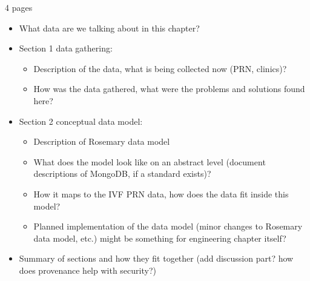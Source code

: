 4 pages

\begin{itemize}
	\item What data are we talking about in this chapter?
	\item Section 1 data gathering:
	\begin{itemize}
		\item Description of the data, what is being collected now (PRN, clinics)?
		\item How was the data gathered, what were the problems and solutions found here?
	\end{itemize}
	\item Section 2 conceptual data model:
	\begin{itemize}
		\item Description of Rosemary data model
		\item What does the model look like on an abstract level (document descriptions of MongoDB, if a standard exists)?
		\item How it maps to the IVF PRN data, how does the data fit inside this model?
		\item Planned implementation of the data model (minor changes to Rosemary data model, etc.) {might be something for engineering chapter itself?}
	\end{itemize}
	\item Summary of sections and how they fit together (add discussion part? how does provenance help with security?)
\end{itemize}